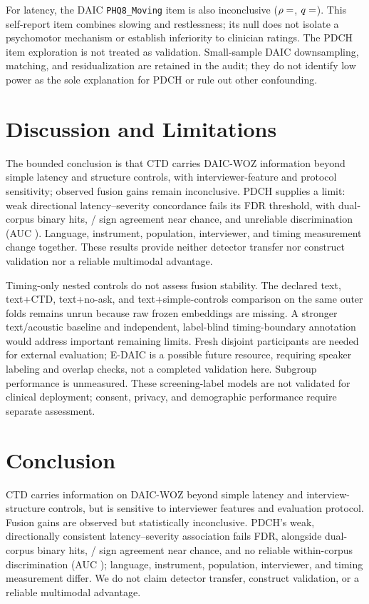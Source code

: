 \documentclass{article}
\begin{document}
For latency, the DAIC \texttt{PHQ8\_Moving} item is also inconclusive ($\rho=\R{movingLatencyr}$, $q=\R{movingLatencyq}$). This self-report item combines slowing and restlessness; its null does not isolate a psychomotor mechanism or establish inferiority to clinician ratings. The PDCH item exploration is not treated as validation. Small-sample DAIC downsampling, matching, and residualization are retained in the audit; they do not identify low power as the sole explanation for PDCH or rule out other confounding.

\section{Discussion and Limitations}
The bounded conclusion is that CTD carries DAIC-WOZ information beyond simple latency and structure controls, with interviewer-feature and protocol sensitivity; observed fusion gains remain inconclusive. PDCH supplies a limit: weak directional latency--severity concordance fails its FDR threshold, with  dual-corpus binary hits, / sign agreement near chance, and unreliable discrimination (AUC ). Language, instrument, population, interviewer, and timing measurement change together. These results provide neither detector transfer nor construct validation nor a reliable multimodal advantage.

Timing-only nested controls do not assess fusion stability. The declared text, text+CTD, text+no-ask, and text+simple-controls comparison on the same outer folds remains unrun because raw frozen embeddings are missing. A stronger text/acoustic baseline and independent, label-blind timing-boundary annotation would address important remaining limits. Fresh disjoint participants are needed for external evaluation; E-DAIC is a possible future resource, requiring speaker labeling and overlap checks, not a completed validation here. Subgroup performance is unmeasured. These screening-label models are not validated for clinical deployment; consent, privacy, and demographic performance require separate assessment.

\section{Conclusion}
CTD carries information on DAIC-WOZ beyond simple latency and interview-structure controls, but is sensitive to interviewer features and evaluation protocol. Fusion gains are observed but statistically inconclusive. PDCH's weak, directionally consistent latency--severity association fails FDR, alongside  dual-corpus binary hits, / sign agreement near chance, and no reliable within-corpus discrimination (AUC ); language, instrument, population, interviewer, and timing measurement differ. We do not claim detector transfer, construct validation, or a reliable multimodal advantage.
\end{document}
